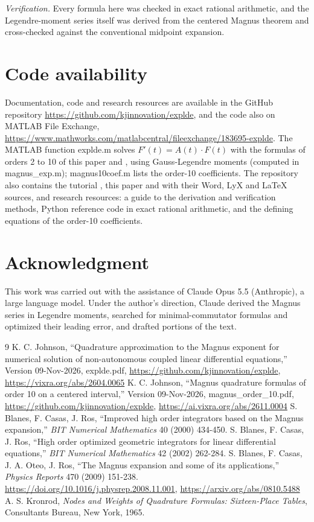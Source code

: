 \documentclass[12pt]{article}
\begin{document}
\emph{Verification.} Every formula here was checked in exact rational arithmetic, and the Legendre-moment series itself was derived from the centered Magnus theorem and cross-checked against the conventional midpoint expansion.

\section*{Code availability}

Documentation, code and research resources are available in the GitHub repository \url{https://github.com/kjinnovation/explde}, and the code also on MATLAB File Exchange, \url{https://www.mathworks.com/matlabcentral/fileexchange/183695-explde}. The MATLAB function explde.m solves $F'(t)=A(t)\cdot F(t)$ with the formulas of orders 2 to 10 of this paper and \cite{j10}, using Gauss-Legendre moments (computed in magnus\_exp.m); magnus10coef.m lists the order-10 coefficients. The repository also contains the tutorial \cite{jtut}, this paper and \cite{j10} with their Word, LyX and LaTeX sources, and research resources: a guide to the derivation and verification methods, Python reference code in exact rational arithmetic, and the defining equations of the order-10 coefficients.

\section*{Acknowledgment}

This work was carried out with the assistance of Claude Opus 5.5 (Anthropic), a large language model. Under the author's direction, Claude derived the Magnus series in Legendre moments, searched for minimal-commutator formulas and optimized their leading error, and drafted portions of the text.

\begin{thebibliography}{9}
 K. C. Johnson, ``Quadrature approximation to the Magnus exponent for numerical solution of non-autonomous coupled linear differential equations,'' Version 09-Nov-2026, explde.pdf, \url{https://github.com/kjinnovation/explde}, \url{https://vixra.org/abs/2604.0065}
 K. C. Johnson, ``Magnus quadrature formulas of order 10 on a centered interval,'' Version 09-Nov-2026, magnus\_order\_10.pdf, \url{https://github.com/kjinnovation/explde}, \url{https://ai.vixra.org/abs/2611.0004}
 S. Blanes, F. Casas, J. Ros, ``Improved high order integrators based on the Magnus expansion,'' \emph{BIT Numerical Mathematics} 40 (2000) 434-450.
 S. Blanes, F. Casas, J. Ros, ``High order optimized geometric integrators for linear differential equations,'' \emph{BIT Numerical Mathematics} 42 (2002) 262-284.
 S. Blanes, F. Casas, J. A. Oteo, J. Ros, ``The Magnus expansion and some of its applications,'' \emph{Physics Reports} 470 (2009) 151-238. \url{https://doi.org/10.1016/j.physrep.2008.11.001}, \url{https://arxiv.org/abs/0810.5488}
 A. S. Kronrod, \emph{Nodes and Weights of Quadrature Formulas: Sixteen-Place Tables}, Consultants Bureau, New York, 1965.
\end{thebibliography}
\end{document}
